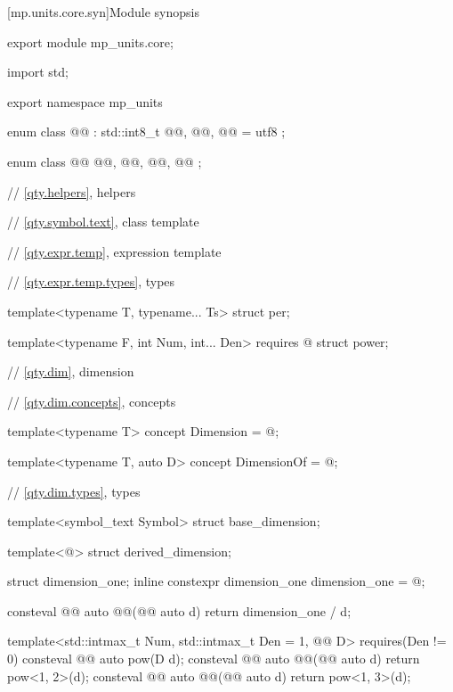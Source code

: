 [mp.units.core.syn]{Module  synopsis}
%
\begin{codeblock}
export module mp_units.core;

import std;

export namespace mp_units {

enum class @@ : std::int8_t { @@, @@, @@ = utf8 };

enum class @@ { @@, @@, @@, @@ };

// \ref{qty.helpers}, helpers

// \ref{qty.symbol.text}, class template 

// \ref{qty.expr.temp}, expression template

// \ref{qty.expr.temp.types}, types

template<typename T, typename... Ts>
struct per;

template<typename F, int Num, int... Den>
  requires @\seebelownc@
struct power;

// \ref{qty.dim}, dimension

// \ref{qty.dim.concepts}, concepts

template<typename T>
concept Dimension = @\seebelownc@;

template<typename T, auto D>
concept DimensionOf = @\seebelownc@;

// \ref{qty.dim.types}, types

template<symbol_text Symbol>
struct base_dimension;

template<@\seebelownc@>
struct derived_dimension;

struct dimension_one;
inline constexpr dimension_one dimension_one = @\seebelownc@;

consteval @@ auto @@(@@ auto d) { return dimension_one / d; }

template<std::intmax_t Num, std::intmax_t Den = 1, @@ D>
  requires(Den != 0)
consteval @@ auto pow(D d);
consteval @@ auto @@(@@ auto d) { return pow<1, 2>(d); }
consteval @@ auto @@(@@ auto d) { return pow<1, 3>(d); }

}
\end{codeblock}
